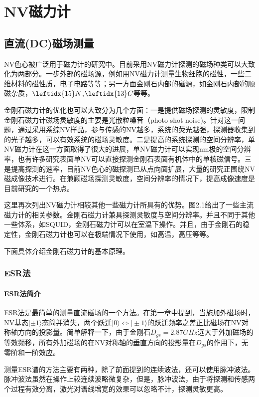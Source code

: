 
\chapter{NV磁力计}

\section{直流(DC)磁场测量}
NV色心被广泛用于磁力计的研究中。目前采用NV磁力计探测的磁场种类可以大致化为两部分。一步外部的磁场源，例如用NV磁力计测量生物细胞的磁性，一些二维材料的磁性质，电子电路等等；另一方面金刚石内部的磁源，如金刚石内部的顺磁杂质，$\leftidx{15}N$,$\leftidx{13}C$等等。

金刚石磁力计的优化也可以大致分为几个方面：一是提供磁场探测的灵敏度，限制金刚石磁力计磁场灵敏度的主要是光散粒噪音（photo shot noise)。针对这一问题，通过采用系综NV样品，参与传感的NV越多，系统的荧光越强，探测器收集到的光子越多，可以有效系统的磁场灵敏度。二是提高的系统探测的空间分辨率，单NV磁力计在这一方面取得了很大的进展，单NV磁力计可以实现nm极的空间分辨率，也有许多研究表面单NV可以直接探测金刚石表面有机体中的单核磁信号。三是提高探测的速率，目前NV色心的磁探测已从点向面扩展，大量的研究正围绕NV磁成像技术进行。在兼顾磁场探测灵敏度，空间分辨率的情况下，提高成像速度是目前研究的一个热点。

这里再次列出NV磁力计相较其他一些磁力计所具有的优势。图2.1给出了一些主流磁力计的相关参数。金刚石磁力计兼具探测灵敏度与空间分辨率。并且不同于其他一些体系，如SQUID，金刚石磁力计可以在室温下操作。并且，由于金刚石的稳定性，金刚石磁力计也可以在极端情况下使用，如高温，高压等等。

下面具体介绍金刚石磁力计的基本原理。
\subsection{ESR法}

\subsubsection{ESR法简介}
ESR法是最简单的测量直流磁场的一个方法。在第一章中提到，当施加外磁场时，NV基态$|\pm{1}\rangle$态简并消失，两个跃迁$|0\rangle\Longleftrightarrow|\pm{1}\rangle$的跃迁频率之差正比磁场在NV对称轴方向的投影量。简单解释一下，由于金刚石$D_{gs}=2.87 \si{GHz}$远大于外加磁场的等效频移，所有外加磁场的在NV对称轴的垂直方向的投影量在$D_{gs}$的作用下，无零阶和一阶效应。

测量ESR谱的方法主要有两种，除了前面提到的连续波法，还可以使用脉冲波法。脉冲波法虽然在操作上较连续波略微复杂，但是，脉冲波法，由于将探测和传感两个过程有效分离，激光对谱线增宽的效果可以忽略不计，探测灵敏更高。

